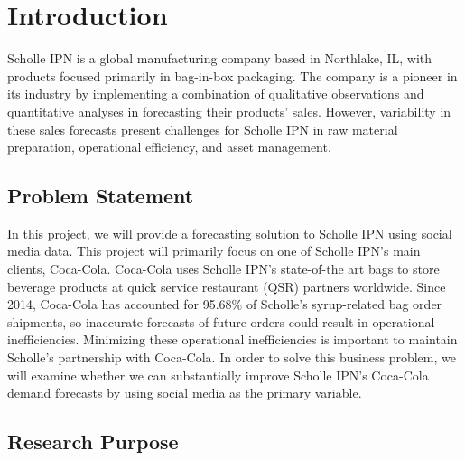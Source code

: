 \documentclass[12pt,oneside]{chicagocapstone}
\begin{document}
  \hypersetup{linkcolor=black}
  \setcounter{tocdepth}{2}
  \tableofcontents

  \listoffigures

  \listoftables


\mainmatter %
\pagestyle{fancyplain} %

\chapter*{Introduction}\label{introduction}

Scholle IPN is a global manufacturing company based in Northlake, IL,
with products focused primarily in bag-in-box packaging. The company is
a pioneer in its industry by implementing a combination of qualitative
observations and quantitative analyses in forecasting their products'
sales. However, variability in these sales forecasts present challenges
for Scholle IPN in raw material preparation, operational efficiency, and
asset management.

\section*{Problem Statement}\label{problem-statement}

In this project, we will provide a forecasting solution to Scholle IPN
using social media data. This project will primarily focus on one of
Scholle IPN's main clients, Coca-Cola. Coca-Cola uses Scholle IPN's
state-of-the art bags to store beverage products at quick service
restaurant (QSR) partners worldwide. Since 2014, Coca-Cola has accounted
for 95.68\% of Scholle's syrup-related bag order shipments, so
inaccurate forecasts of future orders could result in operational
inefficiencies. Minimizing these operational inefficiencies is important
to maintain Scholle's partnership with Coca-Cola. In order to solve this
business problem, we will examine whether we can substantially improve
Scholle IPN's Coca-Cola demand forecasts by using social media as the
primary variable.

\section*{Research Purpose}\label{research-purpose}
\end{document}
